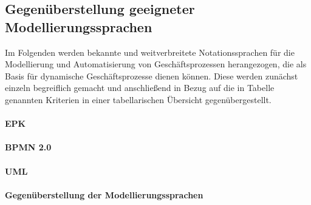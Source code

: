 





\subsection{Gegenüberstellung geeigneter Modellierungssprachen}
Im Folgenden werden bekannte und weitverbreitete Notationssprachen für die Modellierung und Automatisierung von Geschäftsprozessen herangezogen, die als Basis für dynamische Geschäftsprozesse dienen können. Diese werden zunächst einzeln begreiflich gemacht und anschließend in Bezug auf die in Tabelle  genannten Kriterien in einer tabellarischen Übersicht gegenübergestellt.

\paragraph{EPK}

\paragraph{BPMN 2.0}

\paragraph{UML}

\paragraph{Gegenüberstellung der Modellierungssprachen}

